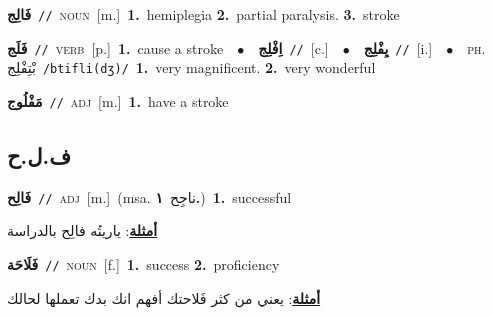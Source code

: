 \documentclass[10pt,a4paper,twoside]{article} %
\begin{document}
\begin{multicols}{2}
{\setlength\topsep{0pt}\textbf{\foreignlanguage{arabic}{فَالِج}}\ {\color{gray}\texttt{//}\color{black}}\ \textsc{noun}\ [m.]\ \textbf{1.}~hemiplegia  \textbf{2.}~partial paralysis.  \textbf{3.}~stroke\ } \vspace{2mm}

{\setlength\topsep{0pt}\textbf{\foreignlanguage{arabic}{فَلَج}}\ {\color{gray}\texttt{//}\color{black}}\ \textsc{verb}\ [p.]\ \textbf{1.}~cause a stroke\ \ $\bullet$\ \ \setlength\topsep{0pt}\textbf{\foreignlanguage{arabic}{اِفْلِج}}\ {\color{gray}\texttt{//}\color{black}}\ [c.]\ \ $\bullet$\ \ \setlength\topsep{0pt}\textbf{\foreignlanguage{arabic}{يِفْلِج}}\ {\color{gray}\texttt{//}\color{black}}\ [i.]\ \ $\bullet$\ \ \textsc{ph.} \color{gray} \foreignlanguage{arabic}{بْتِفْلِج}\color{black}\ {\color{gray}\texttt{/{\sffamily btifli(dʒ)}/}\color{black}}\ \textbf{1.}~very magnificent.  \textbf{2.}~very wonderful\ } \vspace{2mm}

{\setlength\topsep{0pt}\textbf{\foreignlanguage{arabic}{مَفْلُوج}}\ {\color{gray}\texttt{//}\color{black}}\ \textsc{adj}\ [m.]\ \textbf{1.}~have a stroke\ } \vspace{2mm}

\vspace{-3mm}
\subsection*{\color{blue}\foreignlanguage{arabic}{ف.ل.ح}\color{blue}{}} 

{\setlength\topsep{0pt}\textbf{\foreignlanguage{arabic}{فَالِح}}\ {\color{gray}\texttt{//}\color{black}}\ \textsc{adj}\ [m.]\ \color{gray}(msa. \foreignlanguage{arabic}{ناجِح}~\foreignlanguage{arabic}{\textbf{١.}})\color{black}\ \textbf{1.}~successful\  \begin{flushright}\color{gray}\foreignlanguage{arabic}{\textbf{\underline{\foreignlanguage{arabic}{أمثلة}}}: ياريتُه فالِح بالدراسة}\end{flushright}\color{black}} \vspace{2mm}

{\setlength\topsep{0pt}\textbf{\foreignlanguage{arabic}{فَلَاحَة}}\ {\color{gray}\texttt{//}\color{black}}\ \textsc{noun}\ [f.]\ \textbf{1.}~success  \textbf{2.}~proficiency\  \begin{flushright}\color{gray}\foreignlanguage{arabic}{\textbf{\underline{\foreignlanguage{arabic}{أمثلة}}}: يعني من كثر فَلاحتك أفهم انك بدك تعملها لحالك}\end{flushright}\color{black}} \vspace{2mm}


\end{multicols}
\end{document}

